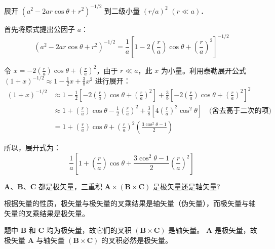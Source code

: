\begin{exercise}\label{ex:1.13}
展开 $(a^2 - 2ar\cos\theta + r^2)^{-1/2}$ 到二级小量 $(r/a)^2$ $(r \ll a)$．
\end{exercise}
\begin{solution}
首先将原式提出公因子 $a$：
$$ (a^2 - 2ar\cos\theta + r^2)^{-1/2} = \frac{1}{a} \left[ 1 - 2\left(\frac{r}{a}\right)\cos\theta + \left(\frac{r}{a}\right)^2 \right]^{-1/2} $$

令 $x = -2\left(\frac{r}{a}\right)\cos\theta + \left(\frac{r}{a}\right)^2$，由于 $r \ll a$，此 $x$ 为小量。利用泰勒展开公式 $(1+x)^{-1/2} \approx 1 - \frac{1}{2}x + \frac{3}{8}x^2$ 进行展开：
$$ \begin{aligned}
(1+x)^{-1/2} &\approx 1 - \frac{1}{2}\left[ -2\left(\frac{r}{a}\right)\cos\theta + \left(\frac{r}{a}\right)^2 \right] + \frac{3}{8}\left[ -2\left(\frac{r}{a}\right)\cos\theta + \left(\frac{r}{a}\right)^2 \right]^2 \\
&\approx 1 + \left(\frac{r}{a}\right)\cos\theta - \frac{1}{2}\left(\frac{r}{a}\right)^2 + \frac{3}{8}\left[ 4\left(\frac{r}{a}\right)^2\cos^2\theta \right] \quad \text{(舍去高于二次的项)} \\
&= 1 + \left(\frac{r}{a}\right)\cos\theta + \left(\frac{r}{a}\right)^2 \left( \frac{3\cos^2\theta - 1}{2} \right)
\end{aligned} $$

所以，展开式为：
$$ \frac{1}{a} \left[ 1 + \left(\frac{r}{a}\right)\cos\theta + \frac{3\cos^2\theta - 1}{2} \left(\frac{r}{a}\right)^2 \right] $$
\end{solution}

\begin{exercise}\label{ex:1.14}
$\boldsymbol{A}$、$\boldsymbol{B}$、$\boldsymbol{C}$ 都是极矢量，三重积 $\boldsymbol{A} \times (\boldsymbol{B} \times \boldsymbol{C})$ 是极矢量还是轴矢量?
\end{exercise}
\begin{solution}
根据矢量的性质，极矢量与极矢量的叉乘结果是轴矢量（伪矢量），而极矢量与轴矢量的叉乘结果是极矢量。

题中 $\boldsymbol{B}$ 和 $\boldsymbol{C}$ 均为极矢量，故它们的叉积 $(\boldsymbol{B} \times \boldsymbol{C})$ 是轴矢量。
$\boldsymbol{A}$ 是极矢量，故极矢量 $\boldsymbol{A}$ 与轴矢量 $(\boldsymbol{B} \times \boldsymbol{C})$ 的叉积必然是极矢量。
\end{solution}

